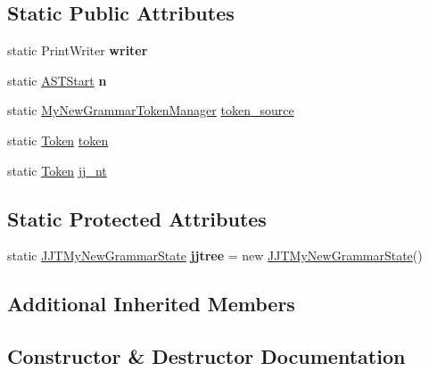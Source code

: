 \subsection*{Static Public Attributes}
\begin{DoxyCompactItemize}
\item 
static Print\+Writer {\bfseries writer}\hypertarget{classpack_1_1_my_new_grammar_a1e3cafaf0b8f4d72a1431a1a46cd9315}{}\label{classpack_1_1_my_new_grammar_a1e3cafaf0b8f4d72a1431a1a46cd9315}

\item 
static \hyperlink{classpack_1_1_a_s_t_start}{A\+S\+T\+Start} {\bfseries n}\hypertarget{classpack_1_1_my_new_grammar_a60047af17707234e4642acc275e8baf1}{}\label{classpack_1_1_my_new_grammar_a60047af17707234e4642acc275e8baf1}

\item 
static \hyperlink{classpack_1_1_my_new_grammar_token_manager}{My\+New\+Grammar\+Token\+Manager} \hyperlink{classpack_1_1_my_new_grammar_ae72eeea9479a4bec0f68aa8ab4463cfb}{token\+\_\+source}
\item 
static \hyperlink{classpack_1_1_token}{Token} \hyperlink{classpack_1_1_my_new_grammar_a3c77799c466ad7209a07f96e17f453da}{token}
\item 
static \hyperlink{classpack_1_1_token}{Token} \hyperlink{classpack_1_1_my_new_grammar_a80d658fb1096f7b4bfbffc2f24e0971d}{jj\+\_\+nt}
\end{DoxyCompactItemize}
\subsection*{Static Protected Attributes}
\begin{DoxyCompactItemize}
\item 
static \hyperlink{classpack_1_1_j_j_t_my_new_grammar_state}{J\+J\+T\+My\+New\+Grammar\+State} {\bfseries jjtree} = new \hyperlink{classpack_1_1_j_j_t_my_new_grammar_state}{J\+J\+T\+My\+New\+Grammar\+State}()\hypertarget{classpack_1_1_my_new_grammar_ade5621be81423d5b95d7e2832c763af1}{}\label{classpack_1_1_my_new_grammar_ade5621be81423d5b95d7e2832c763af1}

\end{DoxyCompactItemize}
\subsection*{Additional Inherited Members}


\subsection{Constructor \& Destructor Documentation}
